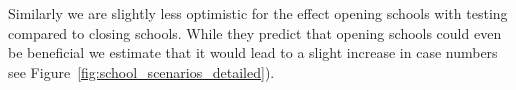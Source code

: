Similarly we are slightly less optimistic for the effect opening schools with testing
compared to closing schools. While they predict that opening schools could even be
beneficial we estimate that it would lead to a slight increase in case numbers
see Figure~\ref{fig:school_scenarios_detailed}).





\FloatBarrier
